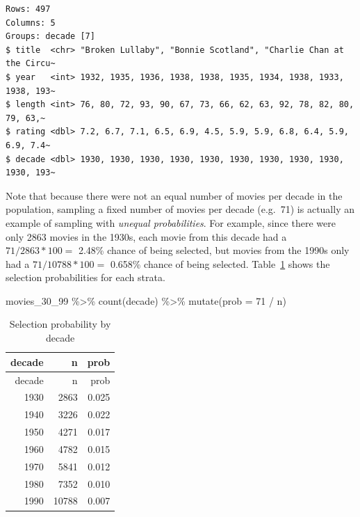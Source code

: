 \documentclass[
  letterpaper,
  DIV=11,
  numbers=noendperiod]{scrreprt}
\newenvironment{Shaded}{\begin{snugshade}}{\end{snugshade}}
\newcommand{\AttributeTok}[1]{\textcolor[rgb]{0.40,0.45,0.13}{#1}}
\newcommand{\DecValTok}[1]{\textcolor[rgb]{0.68,0.00,0.00}{#1}}
\newcommand{\FunctionTok}[1]{\textcolor[rgb]{0.28,0.35,0.67}{#1}}
\newcommand{\NormalTok}[1]{\textcolor[rgb]{0.00,0.23,0.31}{#1}}
\newcommand{\SpecialCharTok}[1]{\textcolor[rgb]{0.37,0.37,0.37}{#1}}
\theoremstyle{definition}
\theoremstyle{remark}
\begin{document}
\begin{verbatim}
Rows: 497
Columns: 5
Groups: decade [7]
$ title  <chr> "Broken Lullaby", "Bonnie Scotland", "Charlie Chan at the Circu~
$ year   <int> 1932, 1935, 1936, 1938, 1938, 1935, 1934, 1938, 1933, 1938, 193~
$ length <int> 76, 80, 72, 93, 90, 67, 73, 66, 62, 63, 92, 78, 82, 80, 79, 63,~
$ rating <dbl> 7.2, 6.7, 7.1, 6.5, 6.9, 4.5, 5.9, 5.9, 6.8, 6.4, 5.9, 6.9, 7.4~
$ decade <dbl> 1930, 1930, 1930, 1930, 1930, 1930, 1930, 1930, 1930, 1930, 193~
\end{verbatim}

Note that because there were not an equal number of movies per decade in
the population, sampling a fixed number of movies per decade (e.g.~71)
is actually an example of sampling with \emph{unequal probabilities}.
For example, since there were only 2863 movies in the 1930s, each movie
from this decade had a \(71 / 2863 * 100 =\) 2.48\% chance of being
selected, but movies from the 1990s only had a \(71 / 10788 * 100 =\)
0.658\% chance of being selected. Table~\ref{tbl-strata-probs} shows the
selection probabilities for each strata.

\begin{Shaded}
\begin{Highlighting}[]
\NormalTok{movies\_30\_99 }\SpecialCharTok{\%\textgreater{}\%} 
  \FunctionTok{count}\NormalTok{(decade) }\SpecialCharTok{\%\textgreater{}\%} 
  \FunctionTok{mutate}\NormalTok{(}\AttributeTok{prob =} \DecValTok{71} \SpecialCharTok{/}\NormalTok{ n)}
\end{Highlighting}
\end{Shaded}

\hypertarget{tbl-strata-probs}{}
\begin{longtable}[]{@{}rrr@{}}
\caption{\label{tbl-strata-probs}Selection probability by
decade}\tabularnewline
\toprule()
decade & n & prob \\
\midrule()
\endfirsthead
\toprule()
decade & n & prob \\
\midrule()
\endhead
1930 & 2863 & 0.025 \\
1940 & 3226 & 0.022 \\
1950 & 4271 & 0.017 \\
1960 & 4782 & 0.015 \\
1970 & 5841 & 0.012 \\
1980 & 7352 & 0.010 \\
1990 & 10788 & 0.007 \\
\bottomrule()
\end{longtable}
\end{document}
